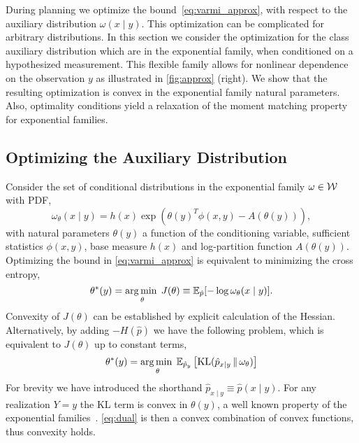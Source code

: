 During planning we optimize the bound~\eqref{eq:varmi_approx}, with
respect to the auxiliary distribution $\omega(x\mid y)$.  This
optimization can be complicated for arbitrary distributions.  In this
section we consider the optimization for the class auxiliary
distribution which are in the exponential family, when conditioned on
a hypothesized measurement.  This flexible family allows for nonlinear
dependence on the observation $y$ as illustrated
in \FIG\ref{fig:approx} (right).  We show that the resulting
optimization is convex in the exponential family natural parameters.
Also, optimality conditions yield a relaxation of the moment
matching property for exponential families.



\subsection{Optimizing the Auxiliary Distribution}

Consider the set of conditional distributions in the exponential family
$\omega \in \mathcal{W}$ with PDF,
\begin{equation}
  \omega_\theta(x \mid y) = h(x)\exp\left( \theta(y)^T \phi(x,y) - A(\theta(y)) \right),
\end{equation}
with natural parameters $\theta(y)$ a function of the conditioning
variable, sufficient statistics $\phi(x,y)$, base measure $h(x)$ and
log-partition function $A(\theta(y))$.  Optimizing the bound
in \EQN\eqref{eq:varmi_approx} is equivalent to minimizing the cross
entropy,
\begin{equation}\label{eq:crossent}
  \theta^{*}(y) = \operatorname*{arg\,min\;}_{\theta} J(\theta) \equiv \mathbb{E}_{\hat{p}}[ - \log \omega_{\theta}(x \mid y) ].
\end{equation}
Convexity of $J(\theta)$ can be established by explicit calculation of
the Hessian.  Alternatively, by adding \mbox{$-H(\hat{p})$} we have
the following problem, which is equivalent to $J(\theta)$ up to
constant terms,
\begin{equation}\label{eq:dual}
  \theta^*(y) = \operatorname*{arg\,min\;}_\theta \mathbb{E}_{\hat{p}_y}\left[ \mathrm{KL}(\hat{p}_{x\mid y}\,\|\,\omega_\theta) \right]
\end{equation}
For brevity we have introduced the shorthand \mbox{$\hat{p}_{x\mid
y} \equiv
\hat{p}(x\mid y)$}.  For any realization $Y=y$ the KL term is convex in
$\theta(y)$, a well known property of the exponential
families~\citep{wainwright_jordan}.  \EQN\eqref{eq:dual} is then a
convex combination of convex functions, thus convexity holds.

